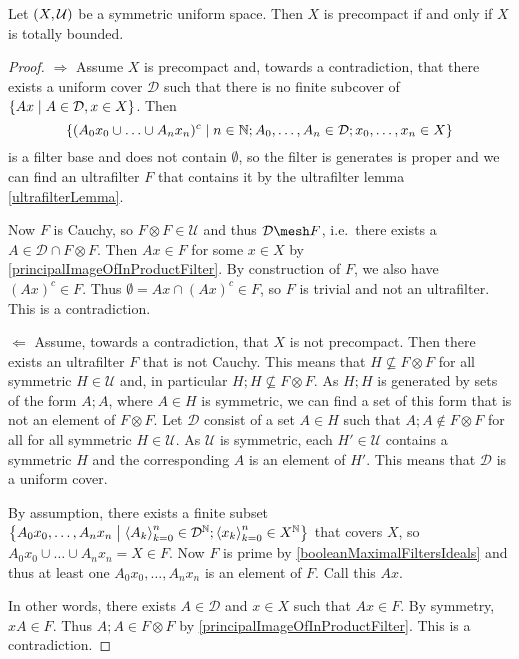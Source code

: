 \begin{proposition} \label{precompactTotallyBounded}
Let $\left( X,\mathcal{U} \right)$ be a symmetric uniform space. Then $X$ is precompact \textup{if and only if} $X$ is totally bounded.
\end{proposition}
\begin{proof}
$\boxed{\Rightarrow}$ Assume $X$ is precompact and, towards a contradiction, that there exists a uniform cover $\mathcal{D}$ such that there is no finite subcover of $\left\{ Ax \;\middle|\; A\in \mathcal{D}, x\in X \right\}$. Then
\[ \left\{ (A_0x_0\cup \ldots \cup A_nx_n)^c \;\middle|\; n\in \mathbb{N}; A_0,\ldots, A_n \in \mathcal{D}; x_0, \ldots, x_n\in X \right\} \]
is a filter base and does not contain $\emptyset$, so the filter is generates is proper and we can find an ultrafilter $F$ that contains it by the ultrafilter lemma \ref{ultrafilterLemma}.

Now $F$ is Cauchy, so $F\otimes F\in \mathcal{U}$ and thus $\mathcal{D}\mesh F$, i.e.\ there exists a $A\in \mathcal{D}\cap F\otimes F$. Then $Ax\in F$ for some $x\in X$ by \ref{principalImageOfInProductFilter}. By construction of $F$, we also have $(Ax)^c\in F$. Thus $\emptyset =  Ax \cap (Ax)^c \in F$, so $F$ is trivial and not an ultrafilter. This is a contradiction.

$\boxed{\Leftarrow}$ Assume, towards a contradiction, that $X$ is not precompact. Then there exists an ultrafilter $F$ that is not Cauchy. This means that $H \not\subseteq F\otimes F$ for all symmetric $H\in\mathcal{U}$ and, in particular $H;H \not\subseteq F\otimes F$. As $H;H$ is generated by sets of the form $A;A$, where $A\in H$ is symmetric, we can find a set of this form that is not an element of $F\otimes F$. Let $\mathcal{D}$ consist of a set $A\in H$ such that $A;A\notin F\otimes F$ for all for all symmetric $H\in \mathcal{U}$. As $\mathcal{U}$ is symmetric, each $H'\in \mathcal{U}$ contains a symmetric $H$ and the corresponding $A$ is an element of $H'$. This means that $\mathcal{D}$ is a uniform cover.

By assumption, there exists a finite subset $\left\{ A_0x_0, \ldots, A_nx_n \;\middle|\; \left\langle A_k \right\rangle_{k=0}^n\in \mathcal{D}^{\mathbb{N}}; \left\langle x_k \right\rangle_{k=0}^n \in X^{\mathbb{N}} \right\}$ that covers $X$, so $A_0x_0 \cup \ldots \cup A_nx_n = X \in F$. Now $F$ is prime by \ref{booleanMaximalFiltersIdeals} and thus at least one $A_0x_0, \ldots, A_nx_n$ is an element of $F$. Call this $Ax$.

In other words, there exists $A\in \mathcal{D}$ and $x\in X$ such that $Ax \in F$. By symmetry, $xA\in F$. Thus $A;A\in F\otimes F$ by \ref{principalImageOfInProductFilter}. This is a contradiction.
\end{proof}



